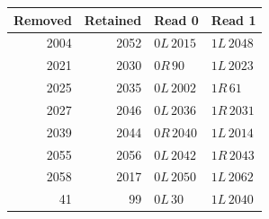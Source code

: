 \begin{tabular}{@{}rrll@{}}
\toprule Removed & Retained & Read 0 & Read 1 \\ \midrule
2004 & 2052 & $0L\,2015$ & $1L\,2048$\\
2021 & 2030 & $0R\,90$ & $1L\,2023$\\
2025 & 2035 & $0L\,2002$ & $1R\,61$\\
2027 & 2046 & $0L\,2036$ & $1R\,2031$\\
2039 & 2044 & $0R\,2040$ & $1L\,2014$\\
2055 & 2056 & $0L\,2042$ & $1R\,2043$\\
2058 & 2017 & $0L\,2050$ & $1L\,2062$\\
41 & 99 & $0L\,30$ & $1L\,2040$\\
\bottomrule
\end{tabular}

